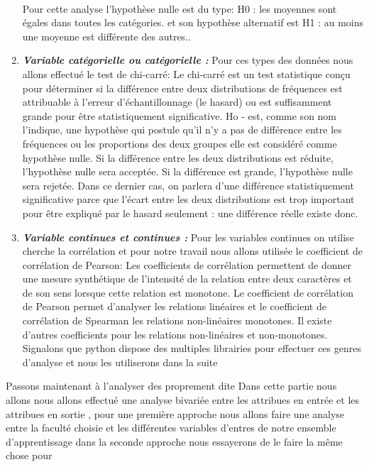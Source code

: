 \begin{enumerate}
	\paragraph{}
	Pour cette analyse l'hypothèse nulle est du type:
	H0 : les moyennes sont égales dans toutes les catégories. 
	et son hypothèse alternatif est 
	H1 : au moins une moyenne est différente des autres..
	\item \emph{\textbf{Variable catégorielle ou catégorielle  :}} 
	Pour ces types des données nous allons effectué le test de chi-carré: Le chi-carré est un test statistique conçu pour déterminer si la différence
	entre deux distributions de fréquences est attribuable à l'erreur
	d'échantillonnage (le hasard) ou est suffisamment grande pour être
	statistiquement significative.
	Ho - est, comme son nom l'indique, une hypothèse qui postule qu'il n'y a pas de différence entre les fréquences ou les proportions des deux groupes elle est considéré comme hypothèse nulle.
	Si la différence entre les deux distributions est réduite, l'hypothèse
	nulle sera acceptée. Si la différence est grande, l'hypothèse nulle sera
	rejetée. Dans ce dernier cas, on parlera d'une différence
	statistiquement significative parce que l'écart entre les deux
	distributions est trop important pour être expliqué par le hasard
	seulement : une différence réelle existe donc.
\item \emph{\textbf{Variable continues et continues  :}} 
Pour les variables continues on utilise cherche la corrélation et pour
notre travail nous allons utilisée le coefficient de corrélation de
Pearson: Les coefficients de corrélation permettent de donner une mesure
synthétique de l'intensité de la relation entre deux caractères et de
son sens lorsque cette relation est monotone. Le coefficient de
corrélation de Pearson permet d'analyser les relations linéaires et le
coefficient de corrélation de Spearman les relations non-linéaires
monotones. Il existe d'autres coefficients pour les relations
non-linéaires et non-monotones.
Signalons que python dispose des multiples librairies pour effectuer ces
genres d'analyse et nous les utiliserons dans la suite
\end{enumerate}
Passons maintenant à l'analyser des proprement dite 
 Dans cette partie nous allons nous allons effectué une analyse bivariée
 entre les attribues en entrée et les attribues en sortie , pour une
 première approche nous allons faire une analyse entre la faculté choisie
 et les différentes variables d'entres de notre ensemble d'apprentissage
 dans la seconde approche nous essayerons de le faire la même chose pour
